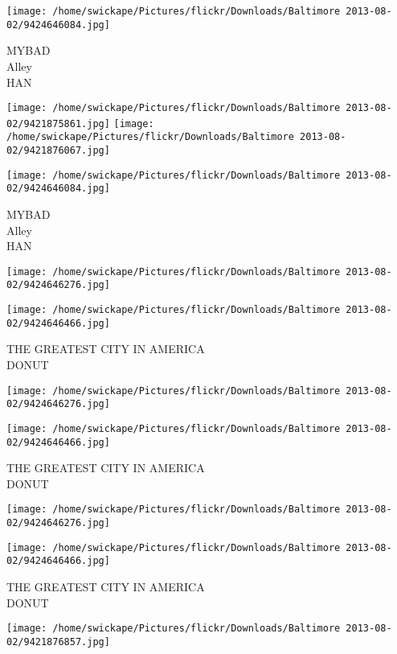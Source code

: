 \documentclass[10pt,letterpaper]{article}
\begin{document}
\texttt{[image: /home/swickape/Pictures/flickr/Downloads/Baltimore 2013-08-02/9424646084.jpg]}

MYBAD\\
Alley\\
HAN\\
\pagebreak

\texttt{[image: /home/swickape/Pictures/flickr/Downloads/Baltimore 2013-08-02/9421875861.jpg]}
\texttt{[image: /home/swickape/Pictures/flickr/Downloads/Baltimore 2013-08-02/9421876067.jpg]}

\texttt{[image: /home/swickape/Pictures/flickr/Downloads/Baltimore 2013-08-02/9424646084.jpg]}

MYBAD\\
Alley\\
HAN\\
\pagebreak

\texttt{[image: /home/swickape/Pictures/flickr/Downloads/Baltimore 2013-08-02/9424646276.jpg]}

\vspace{0.25in}
\texttt{[image: /home/swickape/Pictures/flickr/Downloads/Baltimore 2013-08-02/9424646466.jpg]}

THE GREATEST CITY IN AMERICA\\
DONUT\\
\pagebreak

\texttt{[image: /home/swickape/Pictures/flickr/Downloads/Baltimore 2013-08-02/9424646276.jpg]}

\vspace{0.25in}
\texttt{[image: /home/swickape/Pictures/flickr/Downloads/Baltimore 2013-08-02/9424646466.jpg]}

THE GREATEST CITY IN AMERICA\\
DONUT\\
\pagebreak

\texttt{[image: /home/swickape/Pictures/flickr/Downloads/Baltimore 2013-08-02/9424646276.jpg]}

\vspace{0.25in}
\texttt{[image: /home/swickape/Pictures/flickr/Downloads/Baltimore 2013-08-02/9424646466.jpg]}

THE GREATEST CITY IN AMERICA\\
DONUT\\
\pagebreak

\texttt{[image: /home/swickape/Pictures/flickr/Downloads/Baltimore 2013-08-02/9421876857.jpg]}
\end{document}
